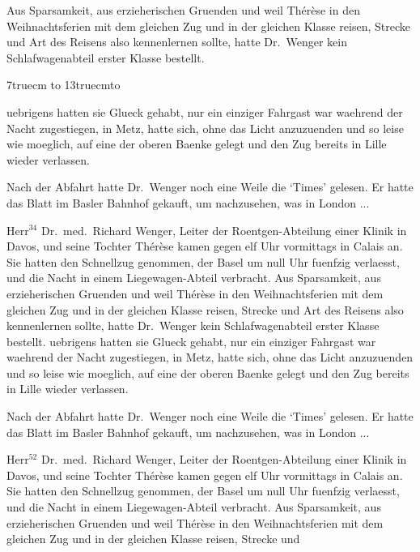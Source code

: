 Aus Sparsamkeit, aus erzieherischen
Gruenden und weil
Th\'e\-r\`ese in den Weihnachtsferien mit dem gleichen
Zug und in der gleichen Klasse reisen, Strecke und
Art des Reisens also kennenlernen sollte, hatte Dr.~Wenger
kein Schlafwagenabteil erster Klasse bestellt.\par
\begin{floatingfigure}{7truecm}%
\vbox to 13truecm{\vfil\hbox to \vfil}%
\end{floatingfigure}
%
uebrigens hatten sie Glueck gehabt, nur ein
einziger Fahrgast war waehrend der Nacht zugestiegen,
in Metz, hatte sich, ohne das Licht anzuzuenden
und so leise wie moeglich, auf eine der oberen
Baenke gelegt und den Zug bereits in Lille wieder
verlassen.\par
Nach der Abfahrt hatte Dr.~Wen\-ger noch eine
Weile die `Times' gelesen. Er hatte das Blatt im
Basler Bahnhof gekauft, um nachzusehen, was in London ...\par
Herr$^{34}$ Dr.~med.~Richard Wenger, Leiter der Roent\-gen-Ab\-tei\-lung
einer Klinik in Davos, und seine
Tochter Th\'e\-r\`ese kamen gegen elf Uhr vormittags
in Calais an. Sie hatten den Schnellzug genommen,
der Basel um null Uhr fuenfzig verlaesst, und die
Nacht in einem Liege\-wagen-Abteil verbracht.
Aus Sparsamkeit, aus erzieherischen
Gruenden und weil
Th\'e\-r\`ese in den Weihnachtsferien mit dem gleichen
Zug und in der gleichen Klasse reisen, Strecke und
Art des Reisens also kennenlernen sollte, hatte Dr.~Wenger
kein Schlafwagenabteil erster Klasse bestellt.
uebrigens hatten sie Glueck gehabt, nur ein
einziger Fahrgast war waehrend der Nacht zugestiegen,
in Metz, hatte sich, ohne das Licht anzuzuenden
und so leise wie moeglich, auf eine der oberen
Baenke gelegt und den Zug bereits in Lille wieder
verlassen.\par
Nach der Abfahrt hatte Dr.~Wen\-ger noch eine
Weile die `Times' gelesen. Er hatte das Blatt im
Basler Bahnhof gekauft, um nachzusehen, was in London ...\par
Herr$^{52}$ Dr.~med.~Richard Wenger, Leiter der Roent\-gen-Ab\-tei\-lung
einer Klinik in Davos, und seine
Tochter Th\'e\-r\`ese kamen gegen elf Uhr vormittags
in Calais an. Sie hatten den Schnellzug genommen,
der Basel um null Uhr fuenfzig verlaesst, und die
Nacht in einem Liege\-wagen-Abteil verbracht.
Aus Sparsamkeit, aus erzieherischen
Gruenden und weil
Th\'e\-r\`ese in den Weihnachtsferien mit dem gleichen
Zug und in der gleichen Klasse reisen, Strecke und
